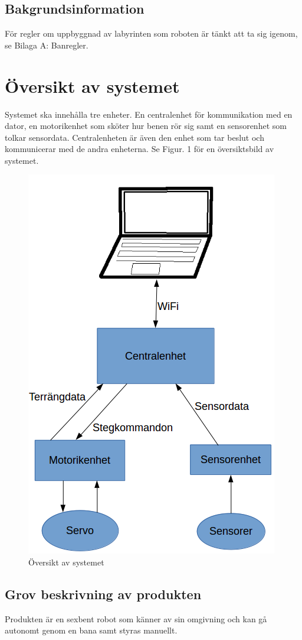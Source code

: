 \documentclass[a4paper,titlepage,12pt]{article}
\begin{document}
	\subsection{Bakgrundsinformation}
	För regler om uppbyggnad av labyrinten som roboten är tänkt att ta sig igenom, se
	Bilaga A: Banregler.


  \newpage
	\section{Översikt av systemet}
	Systemet ska innehålla tre enheter. En centralenhet för kommunikation med en dator, en motorikenhet
	som sköter hur benen rör sig samt en sensorenhet som tolkar sensordata. Centralenheten är även den enhet som
	tar beslut och kommunicerar med de andra enheterna. Se Figur. 1 för en översiktsbild av systemet.
	\begin{figure}[h]
		\centering
		\includegraphics[width=0.5\linewidth]{../images/overview.png}
		\caption{Översikt av systemet}
		\label{fig:../images/overview}
	\end{figure}

	\subsection{Grov beskrivning av produkten}
	Produkten är en sexbent robot som känner av sin omgivning och kan gå autonomt
	genom en bana samt styras manuellt.
\end{document}
